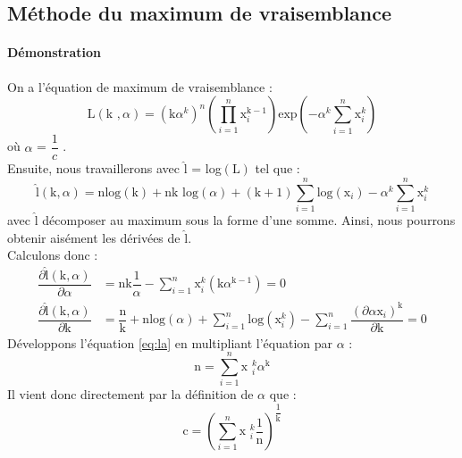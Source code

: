 \subsection{Méthode du maximum de vraisemblance}
\paragraph{Démonstration}
\noindent On a l'équation de maximum de vraisemblance : \\
\begin{equation}
\mbox{L}\left(\mbox{k },\alpha \right) = \left( \mbox{k} \alpha^{k} \right)^{n} \left( \prod\limits_{i=1}^{n} \mbox{x}^{\mbox{k}-1}_{i} \right) \mbox{exp}\left( -\alpha^{k} \sum\limits_{i=1}^n \mbox{x}^{k}_{i}\right)
\end{equation}
où $\alpha$ = $\dfrac{1}{c}$ . \\
Ensuite, nous travaillerons avec $\hat{\mbox{l}}$ = log$\left( \mbox{L} \right)$ tel que : 
\begin{equation}
\hat{\mbox{l}}(\mbox{k},\alpha) = \mbox{nlog}(\mbox{k}) + \mbox{nk log}(\alpha) + (\mbox{k}+1) \sum\limits_{i=1}^{n}\mbox{log}(\mbox{x}_{i}) - \alpha^{k} \sum\limits_{i=1}^{n} \mbox{x}^{k}_{i}
\end{equation}
avec $\hat{\mbox{l}}$ décomposer au maximum sous la forme d'une somme. Ainsi, nous pourrons obtenir aisément les dérivées de $\hat{\mbox{l}}$. \\
Calculons donc :
\begin{align}
\dfrac{\partial\hat{\mbox{l}}(\mbox{k},\alpha)}{\partial \alpha} &= \mbox{nk} \dfrac{1}{\alpha} - \sum\limits_{i=1}^{n} \mbox{x}^{k}_{i} \left( \mbox{k} \alpha^{\mbox{k}-1} \right) = 0 \label{eq:la} \\ \label{eq:lk}
\dfrac{\partial\hat{\mbox{l}}(\mbox{k},\alpha)}{\partial \mbox{k}} &= \dfrac{\mbox{n}}{\mbox{k}} + \mbox{n}\mbox{log}(\alpha) + \sum\limits_{i=1}^{n} \mbox{log}(\mbox{x}^{k}_{i}) - \sum\limits_{i=1}^{n} \dfrac{(\partial \alpha \mbox{x}_{i})^{\mbox{k}}}{\partial \mbox{k}} = 0
\end{align}
Développons l'équation \ref{eq:la} en multipliant l'équation par $\alpha$ :
\begin{equation}
\mbox{n} = \sum\limits_{i=1}^{n} \mbox{x }^{k}_{i} \alpha^{\mbox{k}} 
\end{equation}
Il vient donc directement par la définition de $\alpha$ que :
\begin{equation}
\mbox{c} = \left(\sum\limits_{i=1}^{n} \mbox{x }^{k}_{i}\dfrac{1}{\mbox{n}}\right)^{\dfrac{1}{\mbox{k}}} \label{c}
\end{equation}
